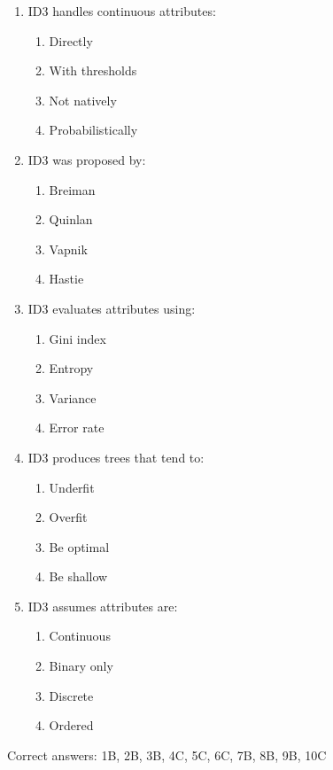 \documentclass[3pt]{article}
\begin{document}
\begin{enumerate}
		\item ID3 handles continuous attributes:
		\begin{enumerate}
			\item Directly
			\item With thresholds
			\item Not natively
			\item Probabilistically
		\end{enumerate}
		
		\item ID3 was proposed by:
		\begin{enumerate}
			\item Breiman
			\item Quinlan
			\item Vapnik
			\item Hastie
		\end{enumerate}
		
		\item ID3 evaluates attributes using:
		\begin{enumerate}
			\item Gini index
			\item Entropy
			\item Variance
			\item Error rate
		\end{enumerate}
		
		\item ID3 produces trees that tend to:
		\begin{enumerate}
			\item Underfit
			\item Overfit
			\item Be optimal
			\item Be shallow
		\end{enumerate}
		
		\item ID3 assumes attributes are:
		\begin{enumerate}
			\item Continuous
			\item Binary only
			\item Discrete
			\item Ordered
		\end{enumerate}
	\end{enumerate}
	
	Correct answers: 1B, 2B, 3B, 4C, 5C, 6C, 7B, 8B, 9B, 10C
	
\vspace{0.3em}
\end{document}
